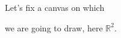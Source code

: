 \documentclass[preview]{standalone}
\begin{document}
\begin{center}
Let's fix a canvas on which

we are going to draw, here $\mathbb{R}^2$.
\end{center}
\end{document}
